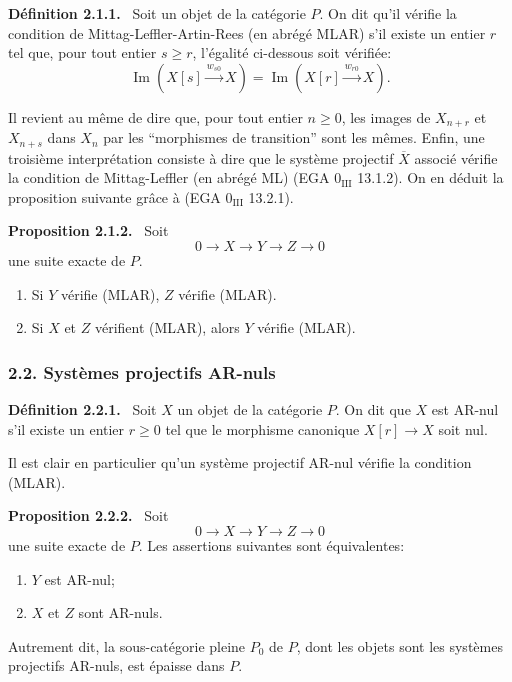 \documentclass[11pt]{article}
\newenvironment{statement}[1]{\par\medskip\noindent\textbf{#1.}\ }{\par\medskip}
\providecommand{\Im}{\operatorname{Im}}
\renewcommand{\Im}{\operatorname{Im}}
\providecommand{\Im}{\operatorname{Im}}
\begin{document}
\begin{statement}{Définition 2.1.1}
Soit un objet de la catégorie $P$. On dit qu'il vérifie la condition de Mittag-Leffler-Artin-Rees (en abrégé MLAR) s'il existe un entier $r$ tel que, pour tout entier $s\ge r$, l'égalité ci-dessous soit vérifiée:
\[
\Im(X[s]\xrightarrow{w_{s0}}X)=\Im(X[r]\xrightarrow{w_{r0}}X).
\]
\end{statement}
Il revient au même de dire que, pour tout entier $n\ge0$, les images de $X_{n+r}$ et $X_{n+s}$ dans $X_n$ par les ``morphismes de transition'' sont les mêmes. Enfin, une troisième interprétation consiste à dire que le système projectif $\overline X$ associé vérifie la condition de Mittag-Leffler (en abrégé ML) (EGA $0_{\mathrm{III}}$ 13.1.2). On en déduit la proposition suivante grâce à (EGA $0_{\mathrm{III}}$ 13.2.1).

\begin{statement}{Proposition 2.1.2}
Soit
\[
0\longrightarrow X\longrightarrow Y\longrightarrow Z\longrightarrow0
\]
une suite exacte de $P$.
\begin{enumerate}[label=(\roman*)]
\item Si $Y$ vérifie (MLAR), $Z$ vérifie (MLAR).
\item Si $X$ et $Z$ vérifient (MLAR), alors $Y$ vérifie (MLAR).
\end{enumerate}
\end{statement}

\subsubsection*{2.2. Systèmes projectifs AR-nuls}
\begin{statement}{Définition 2.2.1}
Soit $X$ un objet de la catégorie $P$. On dit que $X$ est AR-nul s'il existe un entier $r\ge0$ tel que le morphisme canonique $X[r]\to X$ soit nul.
\end{statement}
Il est
clair en particulier qu'un système projectif AR-nul vérifie la condition (MLAR).

\begin{statement}{Proposition 2.2.2}
Soit
\[
0\longrightarrow X\longrightarrow Y\longrightarrow Z\longrightarrow0
\]
une suite exacte de $P$. Les assertions suivantes sont équivalentes:
\begin{enumerate}[label=(\roman*)]
\item $Y$ est AR-nul;
\item $X$ et $Z$ sont AR-nuls.
\end{enumerate}
Autrement dit, la sous-catégorie pleine $P_0$ de $P$, dont les objets sont les systèmes projectifs AR-nuls, est épaisse dans $P$.
\end{statement}
\end{document}
